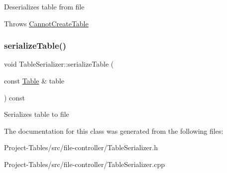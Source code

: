 Deserializes table from file

Throws \hyperlink{classCannotCreateTable}{Cannot\+Create\+Table} \mbox{\label{classTableSerializer_ac27835ff2840e21cf2bc3c7e78ce87a4}} 
\subsubsection{\texorpdfstring{serialize\+Table()}{serializeTable()}}
{\footnotesize\ttfamily void Table\+Serializer\+::serialize\+Table (\begin{DoxyParamCaption}\item[{const \hyperlink{classTable}{Table} \&}]{table }\end{DoxyParamCaption}) const}

Serializes table to file 

The documentation for this class was generated from the following files\+:\begin{DoxyCompactItemize}
\item 
Project-\/\+Tables/src/file-\/controller/Table\+Serializer.\+h\item 
Project-\/\+Tables/src/file-\/controller/Table\+Serializer.\+cpp\end{DoxyCompactItemize}
